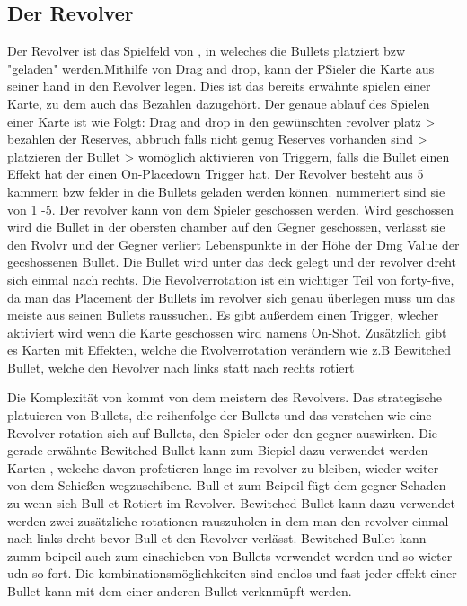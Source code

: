 \subsection{Der Revolver}\label{der_revolver}
Der Revolver ist das Spielfeld von \FF, in weleches die Bullets platziert bzw "geladen" werden.Mithilfe von Drag and drop,
kann der PSieler die Karte aus seiner hand in den Revolver legen. Dies ist das bereits erwähnte spielen einer Karte, zu dem auch das Bezahlen dazugehört.
Der genaue ablauf des Spielen einer Karte ist wie Folgt:
Drag and drop in den gewünschten revolver platz > bezahlen der Reserves, abbruch falls nicht genug Reserves vorhanden sind >
platzieren der Bullet > womöglich aktivieren von Triggern, falls die Bullet einen Effekt hat der einen On-Placedown Trigger hat.
Der  Revolver besteht aus 5 kammern bzw felder in die Bullets geladen werden können. nummeriert sind sie von 1 -5. %
Der revolver kann von dem Spieler geschossen werden. Wird geschossen wird die Bullet in der obersten chamber auf den Gegner geschossen,
verlässt sie den Rvolvr und der Gegner verliert Lebenspunkte in der Höhe der Dmg Value der gecshossenen Bullet.
Die Bullet wird unter das deck gelegt und der revolver dreht sich einmal nach rechts.
Die Revolverrotation ist ein wichtiger Teil von forty-five, da man das Placement der Bullets
im revolver sich genau überlegen muss um das meiste aus seinen Bullets raussuchen. %
Es gibt außerdem einen Trigger, wlecher aktiviert wird wenn die Karte geschossen wird namens On-Shot.
Zusätzlich gibt es Karten mit Effekten, welche die Rvolverrotation verändern wie z.B Bewitched Bullet, welche den Revolver nach links statt nach rechts rotiert

Die Komplexität von \FF kommt von dem meistern des Revolvers. Das strategische platuieren von Bullets,
die reihenfolge der Bullets und das verstehen wie eine Revolver rotation sich auf Bullets, den Spieler oder den gegner auswirken.
Die gerade erwähnte Bewitched Bullet kann zum Biepiel dazu verwendet werden Karten , weleche davon profetieren lange im revolver zu bleiben,
wieder weiter von dem Schießen wegzuschibene. Bull et zum Beipeil fügt dem gegner Schaden zu wenn sich Bull et Rotiert im Revolver. %
Bewitched Bullet kann dazu verwendet werden zwei zusätzliche rotationen rauszuholen in dem man den revolver einmal nach links dreht bevor Bull et den Revolver verlässt.
Bewitched Bullet kann zumm beipeil auch zum einschieben von Bullets verwendet werden und so wieter udn so fort.
Die kombinationsmöglichkeiten sind endlos und fast jeder effekt einer Bullet kann mit dem einer anderen Bullet verknmüpft werden.



